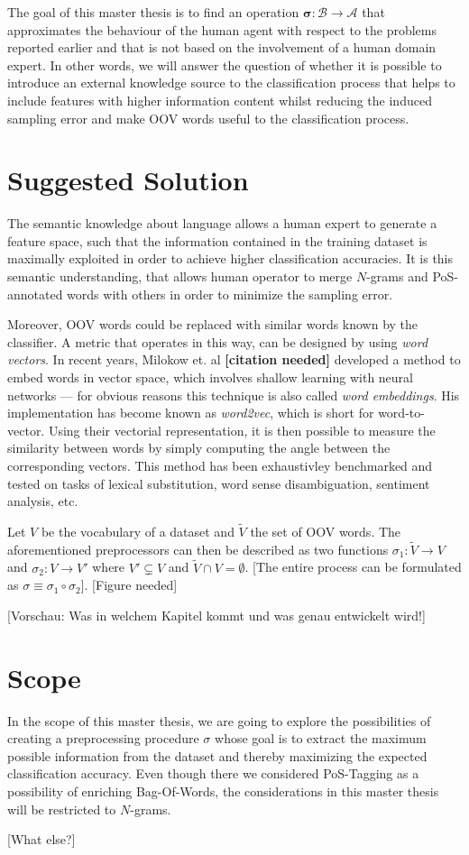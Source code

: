 The goal of this master thesis is to find an operation
$\boldsymbol\sigma: \mathcal{B} \to \mathcal{A}$ that approximates the
behaviour of the human agent with respect to the problems reported earlier and
that is not based on the involvement of a human domain expert. In other words,
we will answer the question of whether it is possible to introduce an external
knowledge source to the classification process that helps to include features
with higher information content whilst reducing the induced sampling
error and make OOV words useful to the classification process.

\section{Suggested Solution}

The semantic knowledge about language allows a human expert to generate a
feature space, such that the information contained in the training dataset is
maximally exploited in order to achieve higher classification accuracies. It is
this semantic understanding, that allows human operator to merge $N$-grams and
PoS-annotated words with others in order to minimize the sampling error.

Moreover, OOV words could be replaced with similar words known by the
classifier.
A metric that operates in this way, can be designed by using \textit{word
vectors}. In recent years, Milokow et. al \textbf{[citation needed]} developed a method
to embed words in vector space, which involves shallow learning with neural
networks --- for obvious reasons this technique is also called \textit{word embeddings}. His
implementation has become known as \emph{word2vec}, which is short for
word-to-vector. Using their  vectorial representation, it is then possible to
measure the similarity between words by simply computing the angle between the
corresponding vectors. This method has been exhaustivley benchmarked and tested
on tasks of lexical substitution, word sense disambiguation, sentiment
analysis, etc.

Let $V$ be the vocabulary of a dataset and $\tilde{V}$ the set of OOV words. The
aforementioned preprocessors can then be described as two functions $\sigma_1:
\tilde{V} \to V$ and  $\sigma_2: V \to V'$ where $V' \subsetneq V$ and
$\tilde{V} \cap V = \emptyset$. [The entire process can be formulated as $\sigma
\equiv \sigma_1 \circ \sigma_2$]. [Figure needed]

[Vorschau: Was in welchem Kapitel kommt und was genau entwickelt wird!]

\section{Scope}

In the scope of this master thesis, we are going to explore the possibilities of
creating a preprocessing procedure $\sigma$ whose goal is to extract the maximum
possible information from the dataset and thereby maximizing the expected
classification accuracy. Even though there we considered PoS-Tagging as a
possibility of enriching Bag-Of-Words, the considerations in this master
thesis will be restricted to $N$-grams.

[What else?]
